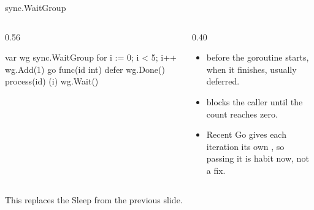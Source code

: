 \documentclass[10pt,aspectratio=169,t]{beamer}
\begin{document}
\begin{frame}[fragile,eyebrow=Goroutines]{sync.WaitGroup}
  \begin{columns}[T]
    \begin{column}{0.56\textwidth}
\begin{golang}
var wg sync.WaitGroup
for i := 0; i < 5; i++ {
    wg.Add(1)
    go func(id int) {
        defer wg.Done()
        process(id)
    }(i)
}
wg.Wait()
\end{golang}
    \end{column}
    \begin{column}{0.40\textwidth}
      \begin{itemize}
        \item {} before the goroutine starts,  when it finishes, usually deferred.
        \item {} blocks the caller until the count reaches zero.
        \item Recent Go gives each iteration its own , so passing it is habit now, not a fix.
      \end{itemize}
    \end{column}
  \end{columns}
  \begin{takeaway}{This replaces the Sleep from the previous slide.}
  \end{takeaway}
\end{frame}
\end{document}
